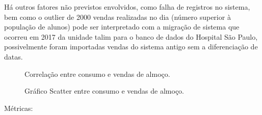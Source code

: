 \documentclass[	12pt, Times, openright, twoside, a4paper, english, brazil]{abntex2}
\begin{document}
        	        Há outros fatores não previstos envolvidos, como falha de registros no sistema, bem como o outlier de 2000 vendas realizadas no dia (número superior à população de alunos) pode ser interpretado com a migração de sistema que ocorreu em 2017 da unidade talim para o banco de dados do Hospital São Paulo, possivelmente foram importadas vendas do sistema antigo sem a diferenciação de datas.
        	        
        	        \begin{figure}[!ht]
                    	\caption{Correlação entre consumo e vendas de almoço. \label{fig:case1_consumo_vendas_almoco} }
                    \end{figure}
                    \begin{figure}[!ht]
                    	\caption{Gráfico Scatter entre consumo e vendas de almoço. \label{fig:case1_scatter_consumo_vendas_almoco} }
                    \end{figure}
                    Métricas:\newline
\end{document}
